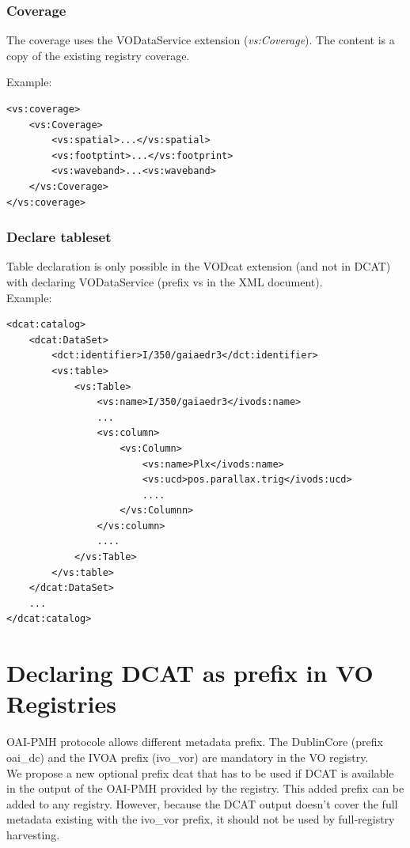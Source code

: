 \documentclass[11pt,a4paper]{ivoa}
\begin{document}
\subsubsection{Coverage}
The coverage uses the VODataService extension (\textit{vs:Coverage}).
The content is a copy of the existing registry coverage. %

Example:
\begin{lstlisting}
<vs:coverage>
    <vs:Coverage>
        <vs:spatial>...</vs:spatial>
        <vs:footptint>...</vs:footprint>
        <vs:waveband>...<vs:waveband>
    </vs:Coverage>
</vs:coverage>
\end{lstlisting}

\subsubsection{Declare tableset}
Table declaration is only possible in the VODcat extension (and not in DCAT) with declaring VODataService (prefix vs in the XML document).\\

Example:

\begin{lstlisting}
<dcat:catalog>
    <dcat:DataSet>
        <dct:identifier>I/350/gaiaedr3</dct:identifier>
        <vs:table>
	        <vs:Table>
	            <vs:name>I/350/gaiaedr3</ivods:name>
	            ...
	            <vs:column>
	                <vs:Column>
	                    <vs:name>Plx</ivods:name>
	                    <vs:ucd>pos.parallax.trig</ivods:ucd>
	                    ....
	                </vs:Columnn>
	            </vs:column>    
	            ....
            </vs:Table>
        </vs:table>
    </dcat:DataSet>
    ...
</dcat:catalog>
\end{lstlisting}


\section{Declaring DCAT as prefix in VO Registries}
OAI-PMH protocole allows different metadata prefix. The DublinCore (prefix oai\_dc) and the IVOA prefix (ivo\_vor) are mandatory in the VO registry.\\

We propose a new optional prefix dcat that has to be used if DCAT is available in the output of the OAI-PMH provided by the registry. This added prefix can be added to any registry. However, because the DCAT output doesn't cover the full metadata existing with the ivo\_vor prefix, it should not be used by full-registry harvesting.\\
 
\end{document}
